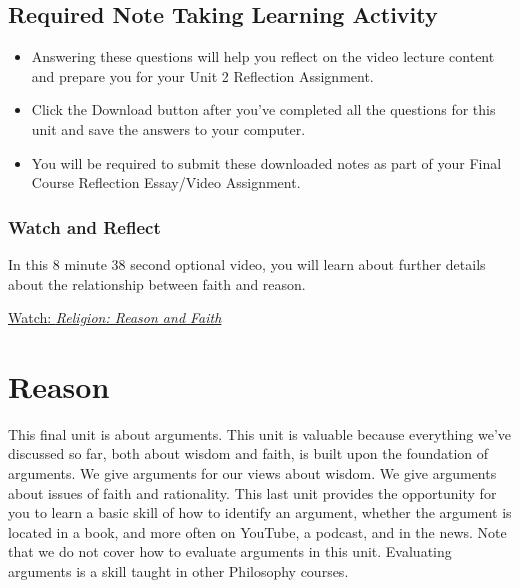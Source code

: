 \documentclass[
]{book}
\providecommand{\tightlist}{%
  \setlength{\itemsep}{0pt}\setlength{\parskip}{0pt}}
\begin{document}
\hypertarget{required-note-taking-learning-activity-1}{%
\section*{Required Note Taking Learning Activity}\label{required-note-taking-learning-activity-1}}

\begin{reflect}
\begin{itemize}
\tightlist
\item
  Answering these questions will help you reflect on the video lecture content and prepare you for your Unit 2 Reflection Assignment.
\item
  Click the Download button after you've completed all the questions for this unit and save the answers to your computer.
\item
  You will be required to submit these downloaded notes as part of your Final Course Reflection Essay/Video Assignment.
\end{itemize}
\end{reflect}

\hypertarget{watch-and-reflect-16}{%
\subsection*{Watch and Reflect}\label{watch-and-reflect-16}}

\begin{reflect}
In this 8 minute 38 second optional video, you will learn about further details about the relationship between faith and reason.

\href{https://www.youtube.com/watch?v=MTPHXNMi9tA}{Watch: \emph{Religion: Reason and Faith}}
\end{reflect}

\hypertarget{reason}{%
\chapter{Reason}\label{reason}}

This final unit is about arguments. This unit is valuable because everything we've discussed so far, both about wisdom and faith, is built upon the foundation of arguments. We give arguments for our views about wisdom. We give arguments about issues of faith and rationality. This last unit provides the opportunity for you to learn a basic skill of how to identify an argument, whether the argument is located in a book, and more often on YouTube, a podcast, and in the news. Note that we do not cover how to evaluate arguments in this unit. Evaluating arguments is a skill taught in other Philosophy courses.
\end{document}
